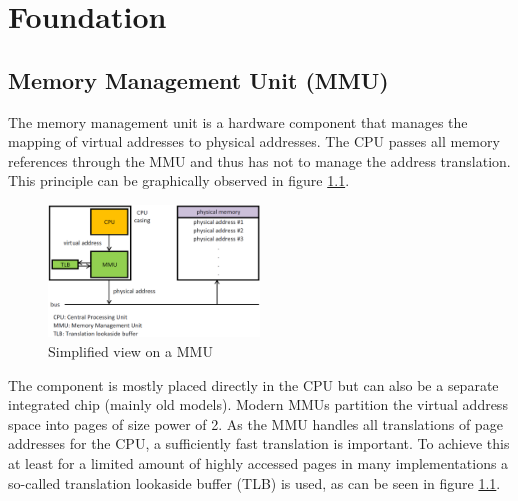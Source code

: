 \chapter{Foundation}\label{chap:foundation}
\section{Memory Management Unit (MMU)}
\cite{tanenbaum_modern_operating_systems_3}
The memory management unit is a hardware component that manages the
mapping of virtual addresses to physical addresses. The CPU passes
all memory references through the MMU and thus has not to manage the
address translation. This principle can be graphically observed in
figure \ref{fig:tanenbaum_mmu_schematic}.
\begin{figure}
    \centering
    \includegraphics[width=0.5\textwidth]{figures/tanenbaum_MMU_principle_updated}
    \caption{Simplified view on a MMU \cite[p.~186ff]{tanenbaum_modern_operating_systems_3}}
    \label{fig:tanenbaum_mmu_schematic}
\end{figure}
The component is mostly placed directly in the
CPU but can also be a separate integrated chip (mainly old models).
Modern MMUs partition the virtual address space into pages of
size power of 2. As the MMU handles all translations of
page addresses for the CPU, a sufficiently fast translation is important.
To achieve this at least for a limited amount of highly
accessed pages in many implementations a so-called 
translation lookaside buffer (TLB) is used, as can be seen in
figure \ref{fig:tanenbaum_mmu_schematic}.

